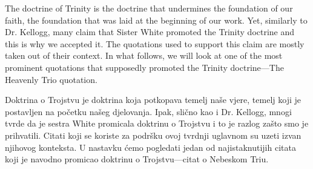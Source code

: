 The doctrine of Trinity is the doctrine that undermines the foundation of our faith, the foundation that was laid at the beginning of our work. Yet, similarly to Dr. Kellogg, many claim that Sister White promoted the Trinity doctrine and this is why we accepted it. The quotations used to support this claim are mostly taken out of their context. In what follows, we will look at one of the most prominent quotations that supposedly promoted the Trinity doctrine—The Heavenly Trio quotation.


Doktrina o Trojstvu je doktrina koja potkopava temelj naše vjere, temelj koji je postavljen na početku našeg djelovanja. Ipak, slično kao i Dr. Kellogg, mnogi tvrde da je sestra White promicala doktrinu o Trojstvu i to je razlog zašto smo je prihvatili. Citati koji se koriste za podršku ovoj tvrdnji uglavnom su uzeti izvan njihovog konteksta. U nastavku ćemo pogledati jedan od najistaknutijih citata koji je navodno promicao doktrinu o Trojstvu—citat o Nebeskom Triu.

